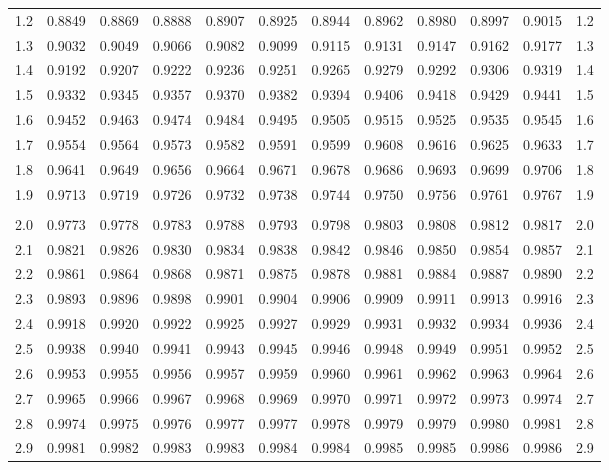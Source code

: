 \documentclass[12pt]{article}
\begin{document}
\begin{landscape}
\begin{adjustbox}{angle=270}
\begin{tabular}{
	r
	@{\hspace{4.5mm}}
	*{5}{c @{\hspace{2.5mm}}} 
	@{\hspace{-0.5mm}}
	*{5}{@{\hspace{2.5mm}} c} 
	@{\hspace{2mm}}
	r
	}
1.2 & 0.8849 & 0.8869 & 0.8888 & 0.8907 & 0.8925 & 0.8944 & 0.8962 & 0.8980 & 0.8997 & 0.9015 & 1.2 \\
1.3 & 0.9032 & 0.9049 & 0.9066 & 0.9082 & 0.9099 & 0.9115 & 0.9131 & 0.9147 & 0.9162 & 0.9177 & 1.3 \\
1.4 & 0.9192 & 0.9207 & 0.9222 & 0.9236 & 0.9251 & 0.9265 & 0.9279 & 0.9292 & 0.9306 & 0.9319 & 1.4 \\
1.5 & 0.9332 & 0.9345 & 0.9357 & 0.9370 & 0.9382 & 0.9394 & 0.9406 & 0.9418 & 0.9429 & 0.9441 & 1.5 \\
1.6 & 0.9452 & 0.9463 & 0.9474 & 0.9484 & 0.9495 & 0.9505 & 0.9515 & 0.9525 & 0.9535 & 0.9545 & 1.6 \\
1.7 & 0.9554 & 0.9564 & 0.9573 & 0.9582 & 0.9591 & 0.9599 & 0.9608 & 0.9616 & 0.9625 & 0.9633 & 1.7 \\
1.8 & 0.9641 & 0.9649 & 0.9656 & 0.9664 & 0.9671 & 0.9678 & 0.9686 & 0.9693 & 0.9699 & 0.9706 & 1.8 \\
1.9 & 0.9713 & 0.9719 & 0.9726 & 0.9732 & 0.9738 & 0.9744 & 0.9750 & 0.9756 & 0.9761 & 0.9767 & 1.9 \\
&&&&&&&&&&{} \\
2.0 & 0.9773 & 0.9778 & 0.9783 & 0.9788 & 0.9793 & 0.9798 & 0.9803 & 0.9808 & 0.9812 & 0.9817 & 2.0 \\
2.1 & 0.9821 & 0.9826 & 0.9830 & 0.9834 & 0.9838 & 0.9842 & 0.9846 & 0.9850 & 0.9854 & 0.9857 & 2.1 \\
2.2 & 0.9861 & 0.9864 & 0.9868 & 0.9871 & 0.9875 & 0.9878 & 0.9881 & 0.9884 & 0.9887 & 0.9890 & 2.2 \\
2.3 & 0.9893 & 0.9896 & 0.9898 & 0.9901 & 0.9904 & 0.9906 & 0.9909 & 0.9911 & 0.9913 & 0.9916 & 2.3 \\
2.4 & 0.9918 & 0.9920 & 0.9922 & 0.9925 & 0.9927 & 0.9929 & 0.9931 & 0.9932 & 0.9934 & 0.9936 & 2.4 \\
2.5 & 0.9938 & 0.9940 & 0.9941 & 0.9943 & 0.9945 & 0.9946 & 0.9948 & 0.9949 & 0.9951 & 0.9952 & 2.5 \\
2.6 & 0.9953 & 0.9955 & 0.9956 & 0.9957 & 0.9959 & 0.9960 & 0.9961 & 0.9962 & 0.9963 & 0.9964 & 2.6 \\
2.7 & 0.9965 & 0.9966 & 0.9967 & 0.9968 & 0.9969 & 0.9970 & 0.9971 & 0.9972 & 0.9973 & 0.9974 & 2.7 \\
2.8 & 0.9974 & 0.9975 & 0.9976 & 0.9977 & 0.9977 & 0.9978 & 0.9979 & 0.9979 & 0.9980 & 0.9981 & 2.8 \\
2.9 & 0.9981 & 0.9982 & 0.9983 & 0.9983 & 0.9984 & 0.9984 & 0.9985 & 0.9985 & 0.9986 & 0.9986 & 2.9 \\

\end{tabular}
\end{adjustbox}
\end{landscape}
\end{document}
